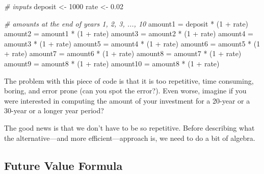 \documentclass[
]{book}
\newenvironment{Shaded}{\begin{snugshade}}{\end{snugshade}}
\newcommand{\CommentTok}[1]{\textcolor[rgb]{0.56,0.35,0.01}{\textit{#1}}}
\newcommand{\DecValTok}[1]{\textcolor[rgb]{0.00,0.00,0.81}{#1}}
\newcommand{\FloatTok}[1]{\textcolor[rgb]{0.00,0.00,0.81}{#1}}
\newcommand{\NormalTok}[1]{#1}
\newcommand{\OtherTok}[1]{\textcolor[rgb]{0.56,0.35,0.01}{#1}}
\newcommand{\SpecialCharTok}[1]{\textcolor[rgb]{0.00,0.00,0.00}{#1}}
\begin{document}
\begin{Shaded}
\begin{Highlighting}[]
\CommentTok{\# inputs}
\NormalTok{deposit }\OtherTok{\textless{}{-}} \DecValTok{1000}
\NormalTok{rate }\OtherTok{\textless{}{-}} \FloatTok{0.02}

\CommentTok{\# amounts at the end of years 1, 2, 3, ..., 10}
\NormalTok{amount1 }\OtherTok{=}\NormalTok{ deposit }\SpecialCharTok{*}\NormalTok{ (}\DecValTok{1} \SpecialCharTok{+}\NormalTok{ rate)}
\NormalTok{amount2 }\OtherTok{=}\NormalTok{ amount1 }\SpecialCharTok{*}\NormalTok{ (}\DecValTok{1} \SpecialCharTok{+}\NormalTok{ rate)}
\NormalTok{amount3 }\OtherTok{=}\NormalTok{ amount2 }\SpecialCharTok{*}\NormalTok{ (}\DecValTok{1} \SpecialCharTok{+}\NormalTok{ rate)}
\NormalTok{amount4 }\OtherTok{=}\NormalTok{ amount3 }\SpecialCharTok{*}\NormalTok{ (}\DecValTok{1} \SpecialCharTok{+}\NormalTok{ rate)}
\NormalTok{amount5 }\OtherTok{=}\NormalTok{ amount4 }\SpecialCharTok{*}\NormalTok{ (}\DecValTok{1} \SpecialCharTok{+}\NormalTok{ rate)}
\NormalTok{amount6 }\OtherTok{=}\NormalTok{ amount5 }\SpecialCharTok{*}\NormalTok{ (}\DecValTok{1} \SpecialCharTok{+}\NormalTok{ rate)}
\NormalTok{amount7 }\OtherTok{=}\NormalTok{ amount6 }\SpecialCharTok{*}\NormalTok{ (}\DecValTok{1} \SpecialCharTok{+}\NormalTok{ rate)}
\NormalTok{amount8 }\OtherTok{=}\NormalTok{ amount7 }\SpecialCharTok{*}\NormalTok{ (}\DecValTok{1} \SpecialCharTok{+}\NormalTok{ rate)}
\NormalTok{amount9 }\OtherTok{=}\NormalTok{ amount8 }\SpecialCharTok{*}\NormalTok{ (}\DecValTok{1} \SpecialCharTok{+}\NormalTok{ rate)}
\NormalTok{amount10 }\OtherTok{=}\NormalTok{ amount8 }\SpecialCharTok{*}\NormalTok{ (}\DecValTok{1} \SpecialCharTok{+}\NormalTok{ rate)}
\end{Highlighting}
\end{Shaded}

The problem with this piece of code is that it is too repetitive, time consuming,
boring, and error prone (can you spot the error?). Even worse, imagine if you
were interested in computing the amount of your investment for a 20-year or
a 30-year or a longer year period?

The good news is that we don't have to be so repetitive. Before describing what
the alternative---and more efficient---approach is, we need to do a bit of algebra.

\hypertarget{future-value-formula}{%
\subsection{Future Value Formula}\label{future-value-formula}}
\end{document}
